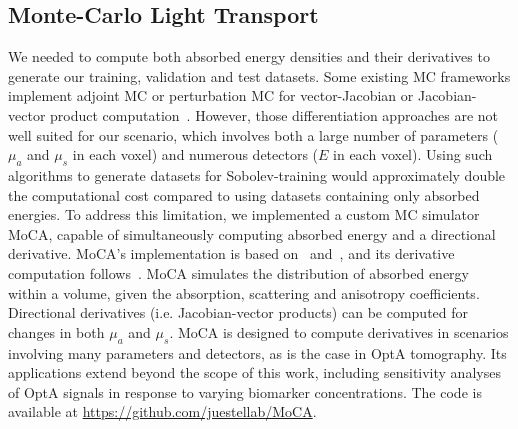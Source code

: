 \documentclass[journal,twoside,web]{ieeecolor}
\begin{document}
\subsection{Monte-Carlo Light Transport}
We needed to compute both absorbed energy densities and their derivatives to generate our training, validation and test datasets. %
Some existing MC frameworks implement adjoint MC or perturbation MC for vector-Jacobian or Jacobian-vector product computation~\cite{Yao2018}. %
However, those differentiation approaches are not well suited for our scenario, which involves both a large number of parameters ($\mu_a$ and $\mu_s$ in each voxel) and numerous detectors ($E$ in each voxel). %
Using such algorithms to generate datasets for Sobolev-training would approximately double the computational cost compared to using datasets containing only absorbed energies. %
To address this limitation, we implemented a custom MC simulator MoCA, capable of simultaneously computing absorbed energy and a directional derivative. %
MoCA’s implementation is based on~\cite{Prahl1989} and~\cite{ElHafi2021}, and its derivative computation follows~\cite{Lataillade2002}. %
MoCA simulates the distribution of absorbed energy within a volume, given the absorption, scattering and anisotropy coefficients. %
Directional derivatives (i.e. Jacobian-vector products) can be computed for changes in both $\mu_a$ and $\mu_s$. %
MoCA is designed to compute derivatives in scenarios involving many parameters and detectors, as is the case in OptA tomography. %
Its applications extend beyond the scope of this work, including sensitivity analyses of OptA signals in response to varying biomarker concentrations.
The code is available at \url{https://github.com/juestellab/MoCA}.\par
\end{document}
